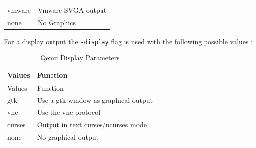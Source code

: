 \documentclass[
  14pt,
  english,
  a4paper,
]{scrreprt}
\begin{document}
\begin{longtable}[]{@{}ll@{}}
\begin{minipage}[t]{0.16\columnwidth}\raggedright
vmware\strut
\end{minipage} & \begin{minipage}[t]{0.44\columnwidth}\raggedright
Vmware SVGA output\strut
\end{minipage}\tabularnewline
\begin{minipage}[t]{0.16\columnwidth}\raggedright
none\strut
\end{minipage} & \begin{minipage}[t]{0.44\columnwidth}\raggedright
No Graphics\strut
\end{minipage}\tabularnewline
\bottomrule
\end{longtable}

For a display output the \texttt{-display} flag is used with the
following possible values :

\hypertarget{tbl:qemu_disp_param}{}
\begin{longtable}[]{@{}ll@{}}
\caption{\label{tbl:qemu_disp_param}Qemu Display
Parameters}\tabularnewline
\toprule
\begin{minipage}[b]{0.12\columnwidth}\raggedright
Values\strut
\end{minipage} & \begin{minipage}[b]{0.51\columnwidth}\raggedright
Function\strut
\end{minipage}\tabularnewline
\midrule
\endfirsthead
\toprule
\begin{minipage}[b]{0.12\columnwidth}\raggedright
Values\strut
\end{minipage} & \begin{minipage}[b]{0.51\columnwidth}\raggedright
Function\strut
\end{minipage}\tabularnewline
\midrule
\endhead
\begin{minipage}[t]{0.12\columnwidth}\raggedright
gtk\strut
\end{minipage} & \begin{minipage}[t]{0.51\columnwidth}\raggedright
Use a gtk window as graphical output\strut
\end{minipage}\tabularnewline
\begin{minipage}[t]{0.12\columnwidth}\raggedright
vnc\strut
\end{minipage} & \begin{minipage}[t]{0.51\columnwidth}\raggedright
Use the vnc protocol\strut
\end{minipage}\tabularnewline
\begin{minipage}[t]{0.12\columnwidth}\raggedright
curses\strut
\end{minipage} & \begin{minipage}[t]{0.51\columnwidth}\raggedright
Output in text curses/ncurses mode\strut
\end{minipage}\tabularnewline
\begin{minipage}[t]{0.12\columnwidth}\raggedright
none\strut
\end{minipage} & \begin{minipage}[t]{0.51\columnwidth}\raggedright
No graphical output\strut
\end{minipage}\tabularnewline
\bottomrule
\end{longtable}
\end{document}
